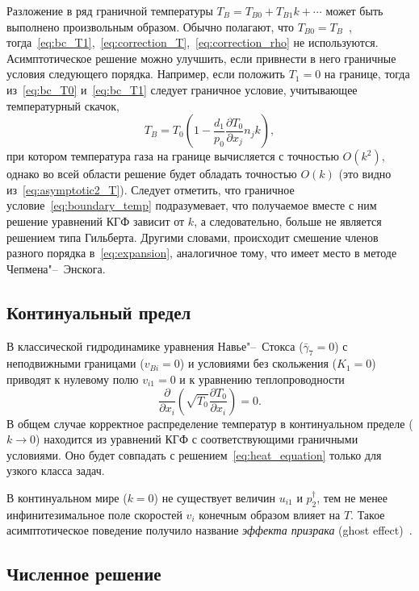 \documentclass[
aps,%
12pt,%
final,%
notitlepage,%
oneside,%
onecolumn,%
nobibnotes,%
nofootinbib,%
superscriptaddress,%
noshowpacs,%
showkeys,%
centertags]%
{revtex4}
\newcommand{\pder}[2][]{\frac{\partial#1}{\partial#2}}
\newcommand{\OO}[1]{O(#1)}
\begin{document}
Разложение в ряд граничной температуры \(T_B = T_{B0} + T_{B1}k + \cdots\) может быть выполнено
произвольным образом. Обычно полагают, что \(T_{B0}=T_B\)~\cite{Sone1996, Alexandrov2002, Aoki2007},
тогда~\eqref{eq:bc_T1},~\eqref{eq:correction_T},~\eqref{eq:correction_rho} не используются.
Асимптотическое решение можно улучшить, если привнести в него граничные условия следующего порядка.
Например, если положить \(T_1=0\) на границе,
тогда из~\eqref{eq:bc_T0} и~\eqref{eq:bc_T1} следует граничное условие,
учитывающее температурный скачок,
\begin{equation}\label{eq:boundary_temp}
    T_B = T_0 \left( 1 - \frac{d_1}{p_0}\pder[T_0]{x_j}n_j k \right),
\end{equation}
при котором температура газа на границе вычисляется с точностью \(\OO{k^2}\),
однако во всей области решение будет обладать точностью \(\OO{k}\) (это видно из~\eqref{eq:asymptotic2_T}).
Следует отметить, что граничное условие~\eqref{eq:boundary_temp} подразумевает,
что получаемое вместе с ним решение уравнений КГФ зависит от \(k\),
а следовательно, больше не является решением типа Гильберта.
Другими словами, происходит смешение членов разного порядка в~\eqref{eq:expansion},
аналогичное тому, что имеет место в методе Чепмена"--~Энскога.

\subsection{Континуальный предел}

В классической гидродинамике уравнения Навье"--~Стокса (\(\bar{\gamma}_7=0\))
с неподвижными границами (\(v_{Bi}=0\)) и условиями без скольжения (\(K_1=0\))
приводят к нулевому полю \(v_{i1}=0\) и к уравнению теплопроводности
\begin{equation}\label{eq:heat_equation}
    \pder{x_i}\left(\sqrt{T_0}\pder[T_0]{x_i}\right) = 0.
\end{equation}
В общем случае корректное распределение температур в континуальном пределе (\(k\to0\))
находится из уравнений КГФ с соответствующими граничными условиями.
Оно будет совпадать с решением~\eqref{eq:heat_equation} только для узкого класса задач.

В континуальном мире (\(k=0\)) не существует величин \(u_{i1}\) и \(p^\dag_2\),
тем не менее инфинитезимальное поле скоростей \(v_i\) конечным образом влияет на \(T\).
Такое асимптотическое поведение получило название \emph{эффекта призрака} (ghost effect)~\cite{Sone2002, Sone2007}.

\subsection{Численное решение}
\end{document}
